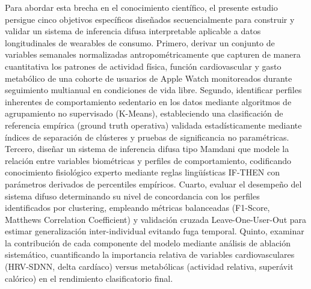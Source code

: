 Para abordar esta brecha en el conocimiento científico, el presente estudio persigue cinco objetivos específicos diseñados secuencialmente para construir y validar un sistema de inferencia difusa interpretable aplicable a datos longitudinales de wearables de consumo. Primero, derivar un conjunto de variables semanales normalizadas antropométricamente que capturen de manera cuantitativa los patrones de actividad física, función cardiovascular y gasto metabólico de una cohorte de usuarios de Apple Watch monitoreados durante seguimiento multianual en condiciones de vida libre. Segundo, identificar perfiles inherentes de comportamiento sedentario en los datos mediante algoritmos de agrupamiento no supervisado (K-Means), estableciendo una clasificación de referencia empírica (ground truth operativa) validada estadísticamente mediante índices de separación de clústeres y pruebas de significancia no paramétricas. Tercero, diseñar un sistema de inferencia difusa tipo Mamdani que modele la relación entre variables biométricas y perfiles de comportamiento, codificando conocimiento fisiológico experto mediante reglas lingüísticas IF-THEN con parámetros derivados de percentiles empíricos. Cuarto, evaluar el desempeño del sistema difuso determinando su nivel de concordancia con los perfiles identificados por clustering, empleando métricas balanceadas (F1-Score, Matthews Correlation Coefficient) y validación cruzada Leave-One-User-Out para estimar generalización inter-individual evitando fuga temporal. Quinto, examinar la contribución de cada componente del modelo mediante análisis de ablación sistemático, cuantificando la importancia relativa de variables cardiovasculares (HRV-SDNN, delta cardíaco) versus metabólicas (actividad relativa, superávit calórico) en el rendimiento clasificatorio final.

%
%
%
%
%
%

